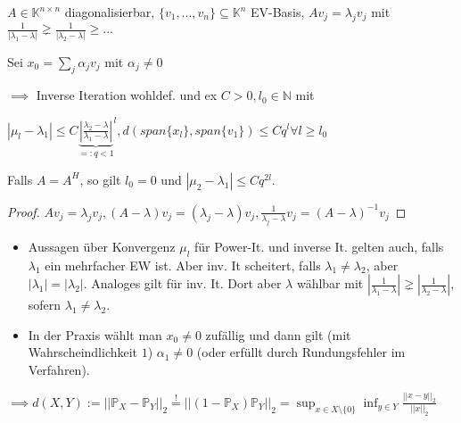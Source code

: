 \begin{corollary}
	$A \in \mathbb{K}^{n\times n}$ diagonalisierbar, $\{v_1, ..., v_n\} \subseteq \mathbb{K}^n$ EV-Basis, $Av_j = \lambda_j v_j$ mit $\frac{1}{|\lambda_1 - \lambda|} \gneq \frac{1}{|\lambda_2 - \lambda|} \geq ...$
	
	Sei $x_0 = \sum_j \alpha_j v_j$ mit $\alpha_j \neq 0$
	
	$\implies$ Inverse Iteration wohldef. und ex $C>0, l_0 \in \mathbb{N}$ mit
	
	$|\mu_l - \lambda_1| \leq C {\underbrace{\left|\frac{\lambda_2-\lambda}{\lambda_1-\lambda}\right|}_{=:q<1}}^l, d(span\{x_l\}, span\{v_1\}) \leq C q^l \forall l \geq l_0$
	
	Falls $A=A^H$, so gilt $l_0 = 0$ und $|\mu_2 - \lambda_1| \leq C q^{2l}$.
\end{corollary}

\begin{proof}
	$Av_j = \lambda_j v_j, (A - \lambda)v_j = (\lambda_j - \lambda)v_j, \frac{1}{\lambda_j - \lambda}v_j = (A-\lambda)^{-1}v_j$
\end{proof}

\begin{remark}
	\begin{itemize}
		\item Aussagen über Konvergenz $\mu_l$ für Power-It. und inverse It. gelten auch, falls $\lambda_1$ ein mehrfacher EW ist. Aber inv. It scheitert, falls $\lambda_1 \neq \lambda_2$, aber $|\lambda_1| = |\lambda_2|$. Analoges gilt für inv. It. Dort aber $\lambda$ wählbar mit $\left|\frac{1}{\lambda_1 - \lambda}\right| \gneq \left|\frac{1}{\lambda_2 - \lambda}\right|$, sofern $\lambda_1 \neq \lambda_2$.
		\item In der Praxis wählt man $x_0 \neq 0$ zufällig und dann gilt (mit Wahrscheindlichkeit $1$) $\alpha_1 \neq 0$ (oder erfüllt durch Rundungsfehler im Verfahren).
	\end{itemize}	
\end{remark}

\begin{lemma}
	$\implies d(X,Y) := ||\mathbb{P}_X - \mathbb{P}_Y||_2 \overset{!}{=} ||(1-\mathbb{P}_X)\mathbb{P}_Y||_2 = \sup_{x\in X\setminus\{0\}} \inf_{y\in Y} \frac{||x-y||_2}{||x||_2}$
\end{lemma}

